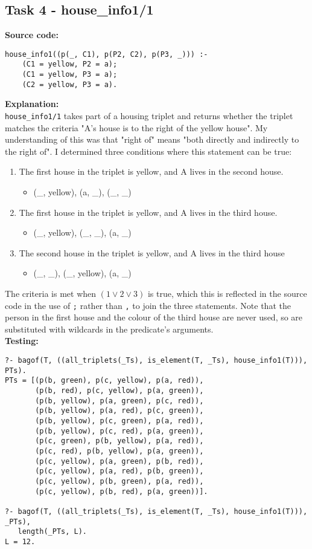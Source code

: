 \documentclass[11pt]{article}
\begin{document}
\subsection{Task 4 - house\_info1/1}
\textbf{Source code:}
\begin{verbatim}
house_info1((p(_, C1), p(P2, C2), p(P3, _))) :-
    (C1 = yellow, P2 = a);
    (C1 = yellow, P3 = a);
    (C2 = yellow, P3 = a).
\end{verbatim}

\textbf{Explanation:} \\
{\verb|house_info1/1|} takes part of a  housing triplet and returns whether the triplet matches the criteria "A's house is to the right of the yellow house". My understanding of this was that "right of" means "both directly and indirectly to the right of". I determined three conditions where this statement can be true:
\begin{enumerate}
  \item The first house in the triplet is yellow, and A lives in the second house.
  \begin{itemize}
  \item (\_, yellow), (a, \_), (\_, \_)
  \end{itemize}
  \item The first house in the triplet is yellow, and A lives in the third house.
  \begin{itemize}
  \item (\_, yellow), (\_, \_), (a, \_)
  \end{itemize}
  \item The second house in the triplet is yellow, and A lives in the third house
  \begin{itemize}
  \item (\_, \_), (\_, yellow), (a, \_)
  \end{itemize}
\end{enumerate}
The criteria is met when $(1 \vee 2 \vee 3)$ is true, which this is reflected in the source code in the use of {\verb|;|} rather than {\verb|,|} to join the three statements. Note that the person in the first house and the colour of the third house are never used, so are substituted with wildcards in the predicate's arguments. \\

\textbf{Testing:}
\begin{verbatim}
?- bagof(T, ((all_triplets(_Ts), is_element(T, _Ts), house_info1(T))), PTs).
PTs = [(p(b, green), p(c, yellow), p(a, red)),
       (p(b, red), p(c, yellow), p(a, green)),
       (p(b, yellow), p(a, green), p(c, red)),
       (p(b, yellow), p(a, red), p(c, green)),
       (p(b, yellow), p(c, green), p(a, red)),  
       (p(b, yellow), p(c, red), p(a, green)),  
       (p(c, green), p(b, yellow), p(a, red)),  
       (p(c, red), p(b, yellow), p(a, green)),  
       (p(c, yellow), p(a, green), p(b, red)),  
       (p(c, yellow), p(a, red), p(b, green)),  
       (p(c, yellow), p(b, green), p(a, red)),  
       (p(c, yellow), p(b, red), p(a, green))].

?- bagof(T, ((all_triplets(_Ts), is_element(T, _Ts), house_info1(T))), _PTs), 
   length(_PTs, L).
L = 12.
\end{verbatim}
\newpage
\end{document}
